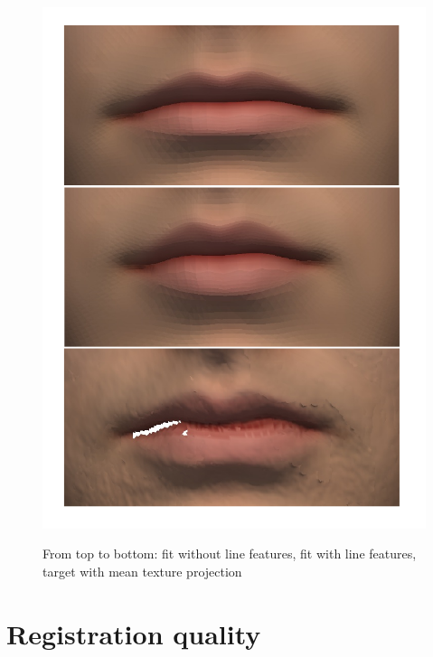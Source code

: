 \begin{figure}[h!]
    \centering
    \includegraphics[width=.6\textwidth]{./resources/img/00029_mouth_comparison.pdf}
    \label{fig:00029_mouth_comparison}
    \caption{From top to bottom: fit without line features, fit with line features, target with mean texture projection}
\end{figure}

\section{Registration quality}

